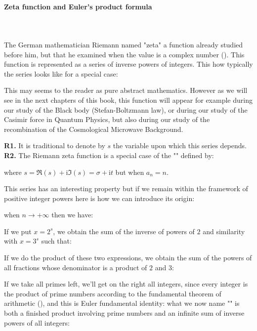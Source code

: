 	\paragraph{Zeta function and Euler's product formula}\label{zeta function}\mbox{}\\\\
	The German mathematician Riemann named "zeta" a function already studied before him, but that he examined when the value is a complex number (). This function is represented as a series of inverse powers of integers. This how typically the series looks like for a special case:
	
	This may seems to the reader as pure abstract mathematics. However as we will see in the next chapters of this book, this function will appear for example during our study of the Black body (Stefan-Boltzmann law), or during our study of the Casimir force in Quantum Physics, but also during our study of the recombination of the Cosmological Microwave Background.
	\begin{tcolorbox}[title=Remarks,colframe=black,arc=10pt]
	\textbf{R1.} It is traditional to denote by $s$ the variable upon which this series depends.\\
	
	\textbf{R2.} The Riemann zeta function is a special case of the "" defined by:
	
	where $s=\Re(s)+\mathrm{i}\Im(s)=\sigma+\mathrm{i}t$ but when $a_n=n$.
	\end{tcolorbox}
	This series has an interesting property but if we remain within the framework of positive integer powers here is how we can introduce its origin:
	
	when $n\longrightarrow +\infty$ then we have:
	
	If we put $x=2^s$, we obtain the sum of the inverse of powers of $2$ and similarity with $x=3^s$ such that:
	
	If we do the product of these two expressions, we obtain the sum of the powers of all fractions whose denominator is a product of $2$ and $3$:
	
	If we take all primes left, we'll get on the right all integers, since every integer is the product of prime numbers according to the fundamental theorem of arithmetic (), and this is Euler fundamental identity: what we now name "" is both a finished product involving prime numbers and an infinite sum of inverse powers of all integers:
	
